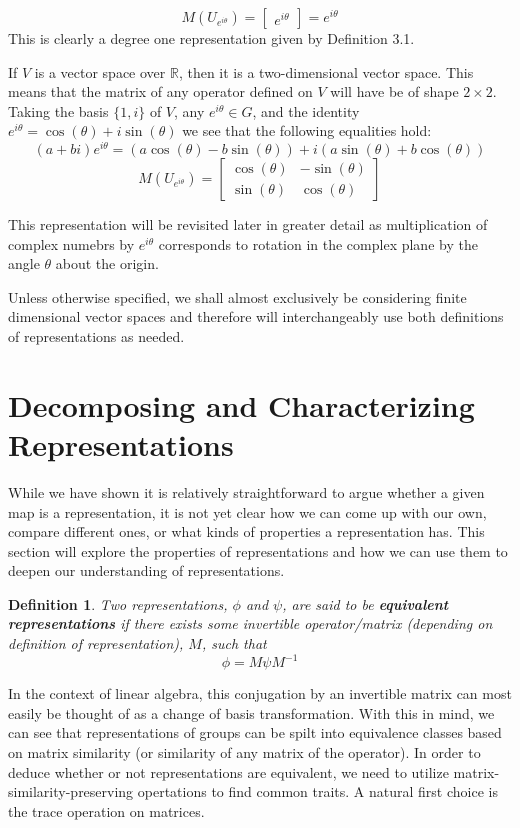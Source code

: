 \documentclass[10pt]{ucthesis}
\newtheorem{definition}{Definition}[chapter]
\begin{document}
$$M(U_{e^{i\theta}}) = \begin{bmatrix}
					e^{i\theta}
				\end{bmatrix} = e^{i\theta} $$
This is clearly a degree one representation given by Definition 3.1.

If $V$ is a vector space over $\mathbb{R}$, then it is a two-dimensional vector space. This means that the matrix of any operator defined on $V$ will have be of shape $2\times2$. Taking the basis $\{1,i\}$ of $V$, any $e^{i\theta} \in G$, and the identity $e^{i\theta} = \cos(\theta) + i\sin(\theta)$ we see that the following equalities hold:
$$(a+bi)e^{i\theta} = (a\cos(\theta)-b\sin(\theta))+i(a\sin(\theta)+b\cos(\theta))$$
$$M(U_{e^{i\theta}}) = \begin{bmatrix}
					\cos(\theta) & -\sin(\theta) \\
                                        \sin(\theta) & \cos(\theta)
				\end{bmatrix}$$

This representation will be revisited later in greater detail as multiplication of complex numebrs by $e^{i\theta}$ corresponds to rotation in the complex plane by the angle $\theta$ about the origin.

Unless otherwise specified, we shall almost exclusively be considering finite dimensional vector spaces and therefore will interchangeably use both definitions of representations as needed.

\section{Decomposing and Characterizing Representations}

While we have shown it is relatively straightforward to argue whether a given map is a representation, it is not yet clear how we can come up with our own, compare different ones, or what kinds of properties a representation has. This section will explore the properties of representations and how we can use them to deepen our understanding of representations.

\begin{definition}
	Two representations, $\phi$ and $\psi$, are said to be \textbf{equivalent representations} if there exists some invertible operator/matrix (depending on definition of representation), $M$, such that $$\phi = M \psi M^{-1}$$
\end{definition}

In the context of linear algebra, this conjugation by an invertible matrix can most easily be thought of as a change of basis transformation. With this in mind, we can see that representations of groups can be spilt into equivalence classes based on matrix similarity (or similarity of any matrix of the operator). In order to deduce whether or not representations are equivalent, we need to utilize matrix-similarity-preserving opertations to find common traits. A natural first choice is the trace operation on matrices.
\end{document}
